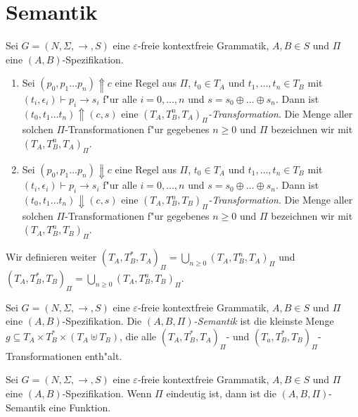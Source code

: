 \documentclass[12pt,a4paper]{article}
\begin{document}
\pagebreak


\section{Semantik}

\begin{definition}[Transformationen]
  Sei $G=(N,\Sigma,\to,S)$ eine $\varepsilon$-freie kontextfreie Grammatik, $A,B \in S$ und
  $\Pi$ eine $(A,B)$-Spezifikation.
  \begin{enumerate}
  \item Sei $(p_0,p_1 \ldots p_n) \Uparrow c$ eine Regel aus $\Pi$, $t_0 \in T_A$ und $t_1,\ldots,t_n \in T_B$
    mit $(t_i,\epsilon_i) \vdash p_i \to s_i$ f"ur alle $i = 0,\ldots,n$ und $s = s_0 \oplus \ldots \oplus s_n$.
    Dann ist $(t_0,t_1 \ldots t_n) \Uparrow (c,s)$ eine \emph{$(T_A,T_B^n,T_A)_\Pi$-Transformation}. Die Menge aller
    solchen $\Pi$-Transformationen f"ur gegebenes $n \ge 0$ und $\Pi$ bezeichnen wir mit $(T_A,T_B^n,T_A)_\Pi$.
  \item Sei $(p_0,p_1 \ldots p_n) \Downarrow c$ eine Regel aus $\Pi$, $t_0 \in T_A$ und $t_1,\ldots,t_n \in T_B$
    mit $(t_i,\epsilon_i) \vdash p_i \to s_i$ f"ur alle $i = 0,\ldots,n$ und $s = s_0 \oplus \ldots \oplus s_n$.
    Dann ist $(t_0,t_1 \ldots t_n) \Downarrow (c,s)$ eine \emph{$(T_A,T_B^n,T_B)_\Pi$-Transformation}. Die Menge aller
    solchen $\Pi$-Transformationen f"ur gegebenes $n \ge 0$ und $\Pi$ bezeichnen wir mit $(T_A,T_B^n,T_B)_\Pi$.
  \end{enumerate}
  Wir definieren weiter $(T_A,T_B^*,T_A)_\Pi=\bigcup_{n \ge 0}(T_A,T_B^n,T_A)_\Pi$ und \\
  $(T_A,T_B^*,T_B)_\Pi=\bigcup_{n \ge 0}(T_A,T_B^n,T_B)_\Pi$.
\end{definition}

\begin{definition}[Semantik]
  Sei $G=(N,\Sigma,\to,S)$ eine $\varepsilon$-freie kontextfreie Grammatik, $A,B \in S$
  und $\Pi$ eine $(A,B)$-Spezifikation. Die \emph{$(A,B,\Pi)$-Semantik} ist die kleinste
  Menge $g \subseteq T_A \times T_B^* \times (T_A \uplus T_B)$, die alle $(T_A,T_B^*,T_A)_\Pi$- und
  $(T_a,T_B^*,T_B)_\Pi$-Transformationen enth"alt.
\end{definition}

\begin{lemma}
  Sei $G=(N,\Sigma,\to,S)$ eine $\varepsilon$-freie kontextfreie Grammatik, $A,B \in S$
  und $\Pi$ eine $(A,B)$-Spezifikation. Wenn $\Pi$ eindeutig ist, dann ist die
  $(A,B,\Pi)$-Semantik eine Funktion.
\end{lemma}
\end{document}
